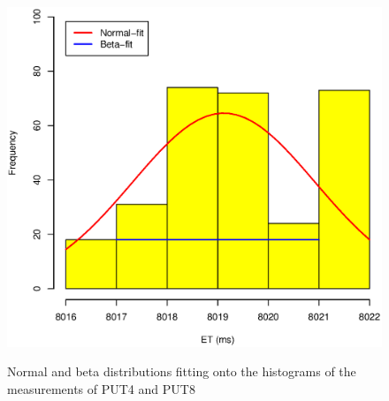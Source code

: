 \documentclass[10pt]{article}
\begin{document}
\begin{figure}[H]
{		\includegraphics[scale=0.43]{figures/sodb12-ntp-on-turbo-off/8_sec_et_hist.eps}
		\label{fig:8_sec_et_hist1}
	}
	\caption{Normal and beta distributions fitting onto the histograms of the measurements of PUT4 and PUT8~\label{fig:extra_pt_hist2}}
\end{figure}
\end{document}
